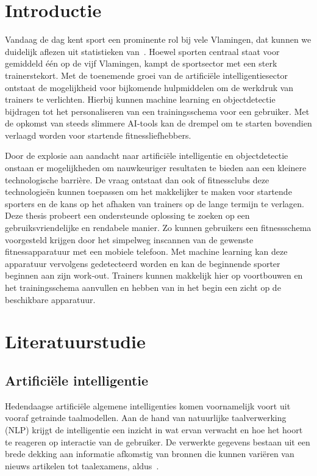 
\section{Introductie}
\label{sec:introductie}
Vandaag de dag kent sport een prominente rol bij vele Vlamingen, dat kunnen we duidelijk aflezen uit statistieken van~\textcite{StatistiekVlaanderen2023}.
Hoewel sporten centraal staat voor gemiddeld \'e\'en op de vijf Vlamingen, kampt de sportsector met een sterk trainerstekort. \autocite{SportVlaanderen2023}
Met de toenemende groei van de artifici\"ele intelligentiesector ontstaat de mogelijkheid voor bijkomende hulpmiddelen om de werkdruk van trainers te verlichten.
Hierbij kunnen machine learning en objectdetectie bijdragen tot het personaliseren van een trainingsschema voor een gebruiker.
Met de opkomst van steeds slimmere AI-tools kan de drempel om te starten bovendien verlaagd worden voor startende fitnessliefhebbers.

Door de explosie aan aandacht naar artifici\"ele intelligentie en objectdetectie onstaan er mogelijkheden om nauwkeuriger resultaten te bieden aan een kleinere technologische barri\`ere.
De vraag ontstaat dan ook of fitnessclubs deze technologie\"en kunnen toepassen om het makkelijker te maken voor startende sporters en de kans op het afhaken van trainers op de lange termijn te verlagen.
Deze thesis probeert een ondersteunde oplossing te zoeken op een gebruiksvriendelijke en rendabele manier.
Zo kunnen gebruikers een fitnessschema voorgesteld krijgen door het simpelweg inscannen van de gewenste fitnessapparatuur met een mobiele telefoon.
Met machine learning kan deze apparatuur vervolgens gedetecteerd worden en kan de beginnende sporter beginnen aan zijn work-out.
Trainers kunnen makkelijk hier op voortbouwen en het trainingsschema aanvullen en hebben van in het begin een zicht op de beschikbare apparatuur.


\section{Literatuurstudie}
\label{sec:state-of-the-art}

\subsection{Artificiële intelligentie}
\label{subsec:artificiele-intelligentie}
Hedendaagse artifici\"ele algemene intelligenties komen voornamelijk voort uit vooraf getrainde taalmodellen.
Aan de hand van natuurlijke taalverwerking (NLP) krijgt de intelligentie een inzicht in wat ervan verwacht en hoe het hoort te reageren op interactie van de gebruiker.
De verwerkte gegevens bestaan uit een brede dekking aan informatie afkomstig van bronnen die kunnen vari\"eren van nieuws artikelen tot taalexamens, aldus~\textcite{Liu2019}.

